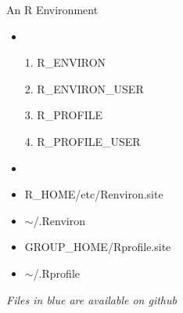 \documentclass{beamer}
\begin{document}
\begin{frame}{An R Environment}

\bigskip

\begin{minipage}{0.4\textwidth}

\begin{itemize}
\item 
\item[1.] R\_ENVIRON\\
\item[2.] R\_ENVIRON\_USER\\
\item[3.] R\_PROFILE\\
\item[4.] R\_PROFILE\_USER\\
\end{itemize}

\end{minipage}
\begin{minipage}{0.5\textwidth}

\begin{itemize}
\item 
\item {\color{red} R\_HOME/etc/Renviron.site\\}
\item {\color{blue} $\sim$/.Renviron}
\item {\color{blue} GROUP\_HOME/Rprofile.site\\}
\item {\color{green} $\sim$/.Rprofile\\}
\end{itemize}

\end{minipage}

\bigskip
\emph{Files in {\color{blue} blue} are available on github}

\end{frame}
\end{document}
